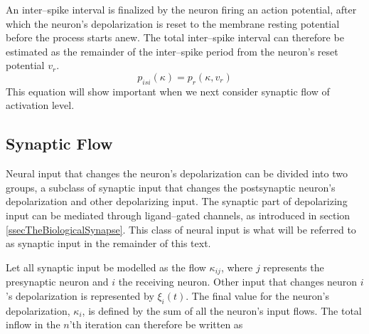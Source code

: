 	An inter--spike interval is finalized by the neuron firing an action potential, after which the neuron's depolarization is reset to the membrane resting potential before the process starts anew.
	The total inter--spike interval can therefore be estimated as the remainder of the inter--spike period from the neuron's reset potential $v_r$.
\begin{equation}
	p_{isi}(\kappa) = p_r(\kappa, v_r)%
	\label{eqEstimateOfInterSpikePeriod}
\end{equation}
	This equation will show important when we next consider synaptic flow of activation level.
	


    \subsection{Synaptic Flow}
	\label{ssecSynapticFlow}
	Neural input that changes the neuron's depolarization can be divided into two groups, a subclass of synaptic input that changes the postsynaptic neuron's depolarization and other depolarizing input.
	The synaptic part of depolarizing input can be mediated through ligand--gated channels, as introduced in section \ref{ssecTheBiologicalSynapse}.
	This class of neural input is what will be referred to as synaptic input in the remainder of this text.

	Let all synaptic input be modelled as the flow $\kappa_{ij}$, where $j$ represents the presynaptic neuron and $i$ the receiving neuron.
	Other input that changes neuron $i$'s depolarization is represented by $\xi_i(t)$.
	The final value for the neuron's depolarization, $\kappa_i$, is defined by the sum of all the neuron's input flows.
	The total inflow in the $n$'th iteration can therefore be written as

